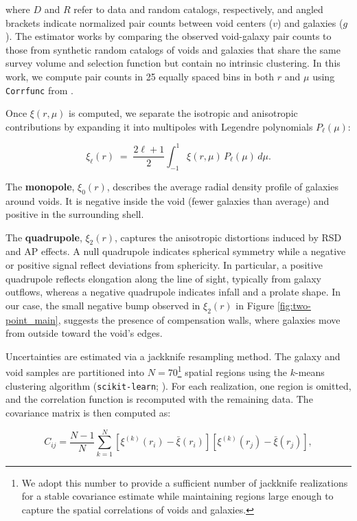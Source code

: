 \documentclass[]{aa} %
\begin{document}
where $D$ and $R$ refer to data and random catalogs, respectively, and angled brackets indicate normalized pair counts between void centers ($v$) and galaxies ($g$). The estimator works by comparing the observed void-galaxy pair counts to those from synthetic random catalogs of voids and galaxies that share the same survey volume and selection function but contain no intrinsic clustering. In this work, we compute pair counts in 25 equally spaced bins in both $r$ and $\mu$ using \texttt{Corrfunc} from \citet{Corrfunc}. 

Once $\xi(r,\mu)$ is computed, we separate the isotropic and anisotropic contributions by expanding it into multipoles with Legendre polynomials $P_\ell(\mu)$:  

\begin{equation}
\xi_\ell(r) \;=\; \frac{2\ell + 1}{2} \int_{-1}^{1} \xi(r,\mu)\, P_\ell(\mu)\, d\mu.
\end{equation}

The \textbf{monopole}, $\xi_0(r)$, describes the average radial density profile of galaxies around voids. It is negative inside the void (fewer galaxies than average) and positive in the surrounding shell. 

The \textbf{quadrupole}, $\xi_2(r)$, captures the anisotropic distortions induced by RSD and AP effects. A null quadrupole indicates spherical symmetry while a negative or positive signal reflect deviations from sphericity. In particular, a positive quadrupole reflects elongation along the line of sight, typically from galaxy outflows, whereas a negative quadrupole indicates infall and a prolate shape. In our case, the small negative bump observed in $\xi_2(r)$ in Figure \ref{fig:two-point_main}, suggests the presence of compensation walls, where galaxies move from outside toward the void's edges.

Uncertainties are estimated via a jackknife resampling method. The galaxy and void samples are partitioned into $N=70$\footnote{We adopt this number to provide a sufficient number of jackknife realizations for a stable covariance estimate while maintaining regions large enough to capture the spatial correlations of voids and galaxies.} spatial regions using the $k$-means clustering algorithm (\texttt{scikit-learn}; \citealt{scikit-learn}). For each realization, one region is omitted, and the correlation function is recomputed with the remaining data.  The covariance matrix is then computed as:

\begin{equation}
C_{ij} = \frac{N-1}{N} \sum_{k=1}^{N} \left[ \xi^{(k)}(r_i) - \bar{\xi}(r_i) \right] \left[ \xi^{(k)}(r_j) - \bar{\xi}(r_j) \right],
\end{equation}
\end{document}
